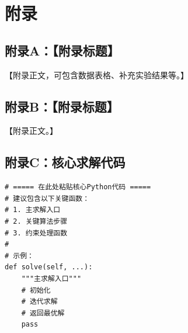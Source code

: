 \documentclass[12pt,letterpaper]{ctexart}
\numberwithin{equation}{section}
\numberwithin{figure}{section}
\numberwithin{table}{section}
\begin{document}
\newpage
\section*{附录}

\subsection*{附录A：【附录标题】}

【附录正文，可包含数据表格、补充实验结果等。】

\subsection*{附录B：【附录标题】}

【附录正文。】

\subsection*{附录C：核心求解代码}

{\small\ttfamily
\begin{verbatim}
# ===== 在此处粘贴核心Python代码 =====
# 建议包含以下关键函数：
# 1. 主求解入口
# 2. 关键算法步骤
# 3. 约束处理函数
#
# 示例：
def solve(self, ...):
    """主求解入口"""
    # 初始化
    # 迭代求解
    # 返回最优解
    pass
\end{verbatim}
}
\end{document}
